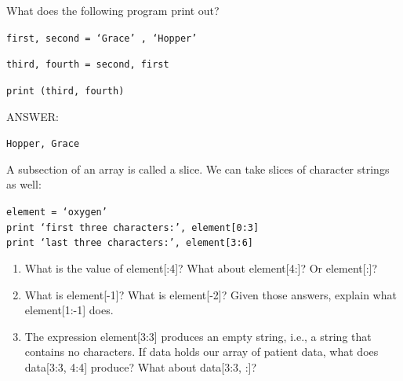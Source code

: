 \documentclass{beamer}
\begin{document}

\begin{frame}{ }
What does the following program print out?
\vspace{0.5cm}

\begin{beamerboxesrounded}[upper=uppercolgreen,lower=lowercolgreen,shadow=false]{}

\texttt{first, second = `Grace' , `Hopper'}

\texttt{third, fourth = second, first}

\texttt{print (third, fourth)}

\end{beamerboxesrounded}

\alert{ANSWER:}

\texttt{Hopper, Grace}
\end{frame}



\begin{frame}{ }
A subsection of an array is called a slice. We can take slices of character strings as well:

\begin{beamerboxesrounded}[upper=uppercolgreen,lower=lowercolgreen,shadow=false]{}

\texttt{element = `oxygen'\\
print `first three characters:', element[0:3]\\
print `last three characters:', element[3:6]\\}
\end{beamerboxesrounded}

\begin{enumerate}
\item{What is the value of element[:4]? What about element[4:]? Or element[:]?}
\item{What is element[-1]? What is element[-2]? Given those answers, explain what element[1:-1] does.}
 \item{The expression element[3:3] produces an empty string, i.e., a string that contains no characters. If data holds our array of patient data, what does data[3:3, 4:4] produce? What about data[3:3, :]?}
\end{enumerate}

\end{frame}
\end{document}
